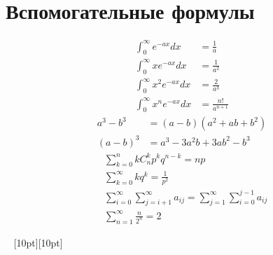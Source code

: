 \documentclass[a4paper,12pt,fleqn]{article}
\numberwithin{figure}{section}
\theoremstyle{definition}
\def\vignette{\vspace{48pt} \noindent \hrulefill~
	          \raisebox{-8pt}[10pt][10pt]{\Huge\ding{102}}
	          ~\hrulefill}
\begin{document}
\section{Вспомогательные формулы}

\begin{align*}
	   \int_0^\infty     e^{-ax}dx &= \frac{1}{a}
	\\ \int_0^\infty x   e^{-ax}dx &= \frac{1}{a^2}
	\\ \int_0^\infty x^2 e^{-ax}dx &= \frac{2}{a^3}
	\\ \int_0^\infty x^n e^{-ax}dx &= \frac{n!}{a^{n+1}}
\end{align*}
\begin{align*}
	   a^3-b^3 &= (a-b)(a^2+ab+b^2)
	\\ (a-b)^3 &= a^3-3a^2b+3ab^2-b^3
\end{align*}
\begin{align*}
&	\sum_{k=0}^n k C_n^k p^k q^{n-k} = np \\
&	\sum_{k=0}^{\infty}kq^k = \frac{1}{p^2} \\
&	\sum_{i=0}^{\infty}\sum_{j=i+1}^{\infty}a_{ij} =
	\sum_{j=1}^{\infty}\sum_{i=0}^{j-1}a_{ij} \\
&	\sum_{n=1}^{\infty}\frac{n}{2^n} = 2
\end{align*}

\vignette
\end{document}

